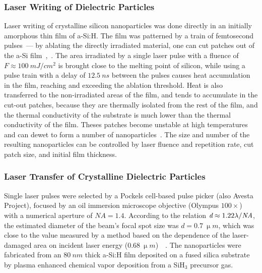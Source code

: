         \subsubsection{Laser Writing of Dielectric Particles}
        \label{met:writing}
                Laser writing of crystalline silicon nanoparticles was done directly in an initially amorphous thin film of a-Si:H.
            The film was patterned by a train of femtosecond pulses~--- by ablating the directly irradiated material, one can cut patches
            out of the a-Si film~\cite{makarov2016controllable},~. The area irradiated by a single laser pulse
            with a fluence of $F\approx100~\si{mJ/cm^{2}}$ is brought close to the melting point of silicon, while using a pulse train with
            a delay of $12.5~\si{ns}$ between the pulses causes heat accumulation in the film, reaching and exceeding the ablation threshold.
                Heat is also transferred to the non-irradiated areas of the film, and tends to accumulate in the cut-out patches, because they
            are thermally isolated from the rest of the film, and the thermal conductivity of the substrate is much lower than the thermal
            conductivity of the film. Theses patches become unstable at high temperatures and can dewet to form a number of nanoparticles~\cite{thompson2012solid}.
            The size and number of the resulting nanoparticles can be controlled by laser fluence and repetition rate, cut patch size, and
            initial film thickness.

        \subsubsection{Laser Transfer of Crystalline Dielectric Particles}
        \label{met:transfer}
                Single laser pulses were selected by a Pockels cell-based pulse picker (also Avesta Project),
            focused by an oil immersion microscope objective (Olympus $100\times$)
            with a numerical aperture of $\mathit{NA}=1.4$. According to the relation $\emph{d}\approx 1.22\lambda/\mathit{NA}$, the estimated
            diameter of the beam's focal spot size was $d=0.7~\si{\upmu m}$, which was close to the value measured by a method based on
            the dependence of the laser-damaged area on incident laser energy ($0.68~\si{\upmu m}$)~~\cite{liu1982simple}.
            The nanoparticles were fabricated from an $80~\si{nm}$ thick a-Si:H film deposited on a fused silica substrate by
            plasma enhanced chemical vapor deposition from a SiH$_{3}$ precursor gas.

